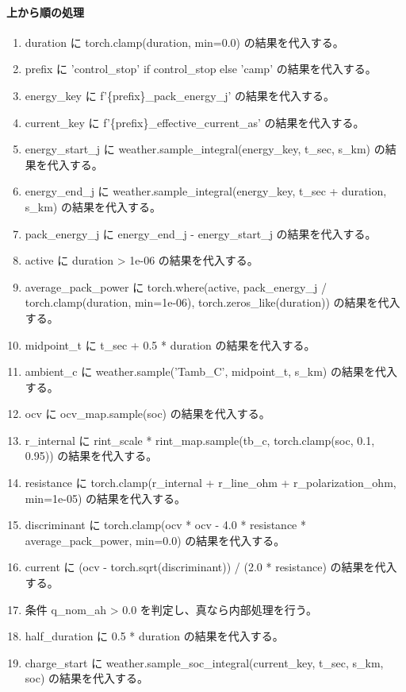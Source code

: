 \documentclass[a4paper,11pt]{article}
\begin{document}
            \paragraph{上から順の処理}
            \begin{enumerate}[leftmargin=1.8em]
            \item duration に torch.clamp(duration, min=0.0) の結果を代入する。
\item prefix に 'control\_stop' if control\_stop else 'camp' の結果を代入する。
\item energy\_key に f'\{prefix\}\_pack\_energy\_j' の結果を代入する。
\item current\_key に f'\{prefix\}\_effective\_current\_as' の結果を代入する。
\item energy\_start\_j に weather.sample\_integral(energy\_key, t\_sec, s\_km) の結果を代入する。
\item energy\_end\_j に weather.sample\_integral(energy\_key, t\_sec + duration, s\_km) の結果を代入する。
\item pack\_energy\_j に energy\_end\_j - energy\_start\_j の結果を代入する。
\item active に duration > 1e-06 の結果を代入する。
\item average\_pack\_power に torch.where(active, pack\_energy\_j / torch.clamp(duration, min=1e-06), torch.zeros\_like(duration)) の結果を代入する。
\item midpoint\_t に t\_sec + 0.5 * duration の結果を代入する。
\item ambient\_c に weather.sample('Tamb\_C', midpoint\_t, s\_km) の結果を代入する。
\item ocv に ocv\_map.sample(soc) の結果を代入する。
\item r\_internal に rint\_scale * rint\_map.sample(tb\_c, torch.clamp(soc, 0.1, 0.95)) の結果を代入する。
\item resistance に torch.clamp(r\_internal + r\_line\_ohm + r\_polarization\_ohm, min=1e-05) の結果を代入する。
\item discriminant に torch.clamp(ocv * ocv - 4.0 * resistance * average\_pack\_power, min=0.0) の結果を代入する。
\item current に (ocv - torch.sqrt(discriminant)) / (2.0 * resistance) の結果を代入する。
\item 条件 q\_nom\_ah > 0.0 を判定し、真なら内部処理を行う。
\item   half\_duration に 0.5 * duration の結果を代入する。
\item   charge\_start に weather.sample\_soc\_integral(current\_key, t\_sec, s\_km, soc) の結果を代入する。

\end{enumerate}
\end{document}
